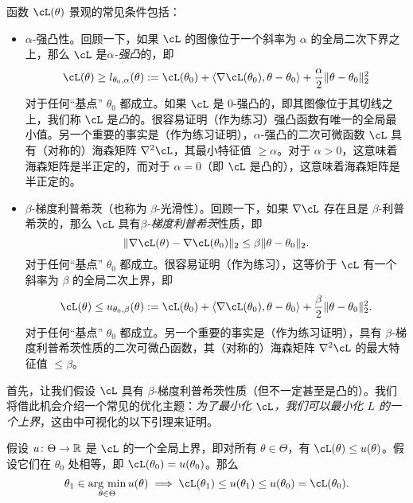 \documentclass[../../book-main.tex]{subfiles}
\begin{document}
函数 \(\cL(\theta)\) 景观的常见条件包括：
\begin{itemize}
    \item \(\alpha\)-强凸性。回顾一下，如果 \(\cL\) 的图像位于一个斜率为 \(\alpha\) 的全局二次下界之上，那么 \(\cL\) 是\textit{\(\alpha\)-强凸}的，即
    \begin{equation}
        \cL(\theta) \geq l_{\theta_{0}, \alpha}(\theta) := \cL(\theta_{0}) + \ip{\nabla \cL(\theta_{0})}{\theta - \theta_{0}} + \frac{\alpha}{2}\norm{\theta - \theta_{0}}_{2}^{2}
    \end{equation}
    对于任何“基点” \(\theta_{0}\) 都成立。如果 \(\cL\) 是 \(0\)-强凸的，即其图像位于其切线之上，我们称 \(\cL\) 是\textit{凸}的。很容易证明（作为练习）强凸函数有唯一的全局最小值。另一个重要的事实是（作为练习证明），\(\alpha\)-强凸的二次可微函数 \(\cL\) 具有（对称的）海森矩阵 \(\nabla^{2}\cL\)，其最小特征值 \(\geq \alpha\)。对于 \(\alpha > 0\)，这意味着海森矩阵是半正定的，而对于 \(\alpha = 0\)（即 \(\cL\) 是凸的），这意味着海森矩阵是半正定的。
    \item \(\beta\)-梯度利普希茨（也称为 \(\beta\)-光滑性）。回顾一下，如果 \(\nabla \cL\) 存在且是 \(\beta\)-利普希茨的，那么 \(\cL\) 具有\textit{\(\beta\)-梯度利普希茨}性质，即
    \begin{equation}
        \norm{\nabla \cL(\theta) - \nabla \cL(\theta_{0})}_{2} \leq \beta \norm{\theta - \theta_{0}}_{2}.
    \end{equation}
    对于任何“基点” \(\theta_{0}\) 都成立。很容易证明（作为练习），这等价于 \(\cL\) 有一个斜率为 \(\beta\) 的全局二次上界，即
    \begin{equation}
        \cL(\theta) \leq u_{\theta_{0}, \beta}(\theta) := \cL(\theta_{0}) + \ip{\nabla \cL(\theta_{0})}{\theta - \theta_{0}} + \frac{\beta}{2}\norm{\theta - \theta_{0}}_{2}^{2}.
    \end{equation}
    对于任何“基点” \(\theta_{0}\) 都成立。另一个重要的事实是（作为练习证明），具有 \(\beta\)-梯度利普希茨性质的二次可微凸函数，其（对称的）海森矩阵 \(\nabla^{2}\cL\) 的最大特征值 \(\leq \beta\)。
\end{itemize}
首先，让我们假设 \(\cL\) 具有 \(\beta\)-梯度利普希茨性质（但不一定甚至是凸的）。我们将借此机会介绍一个常见的优化主题：\textit{为了最小化 \(\cL\)，我们可以最小化 \(L\) 的一个上界}，这由中可视化的以下引理来证明。
\begin{lemma}[主化-最小化]\label{lem:majorization_minimization}
    假设 \(u \colon \Theta \to \mathbb{R}\) 是 \(\cL\) 的一个全局上界，即对所有 \(\theta \in \Theta\)，有 \(\cL(\theta) \leq u(\theta)\)。假设它们在 \(\theta_{0}\) 处相等，即 \(\cL(\theta_{0}) = u(\theta_{0})\)。那么
    \begin{equation}
        \theta_{1} \in \argmin_{\theta \in \Theta}u(\theta) \implies \cL(\theta_{1}) \leq u(\theta_{1}) \leq u(\theta_{0}) = \cL(\theta_{0}).
    \end{equation}
\end{lemma}
\end{document}
